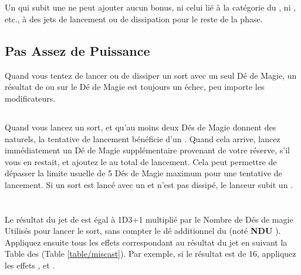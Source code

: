\subsection{\lostfocus}

Un \wizard{} qui subit une \lostfocus{} ne peut ajouter aucun bonus, ni celui lié à la catégorie du \wizard{}, ni \overwhelmingpower{}, etc., à des jets de lancement ou de dissipation pour le reste de la phase.

\subsection{Pas Assez de Puissance}

Quand vous tentez de lancer ou de dissiper un sort avec un seul Dé de Magie, un résultat de  ou  sur le Dé de Magie est toujours un échec, peu importe les modificateurs.

\subsection{\overwhelmingpower}

Quand vous lancez un sort, et qu'au moins deux Dés  de Magie donnent des  naturels, la tentative de lancement bénéficie d'un \overwhelmingpower{}. Quand cela arrive, lancez immédiatement un Dé de Magie supplémentaire provenant de votre réserve, s'il vous en restait, et ajoutez le au total de lancement. Cela peut permettre de dépasser la limite usuelle de 5 Dés de Magie maximum pour une tentative de lancement. Si un sort est lancé avec un \overwhelmingpower{} et n'est pas dissipé, le lanceur subit un \miscast{}.

\newpage
\section{\miscast}
\label{miscast}

Le résultat du jet de \miscast{} est égal à 1D3+1 multiplié par le Nombre de Dés de magie Utilisés pour lancer le sort, sans compter le dé additionnel du \overwhelmingpower{} (noté \og \textbf{NDU} \fg{}). Appliquez ensuite tous les effets correspondant au résultat du jet en suivant la Table des \miscasts{} (Table \ref{table/miscast}). Par exemple, si le résultat est de 16, appliquez les effets \witchfire{}, \amnesia{} et \catastrophicdetonation{}.


